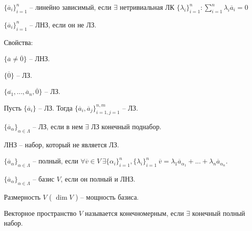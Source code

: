 	\begin{Def}
		$\{\overline{a}_i\}_{i = 1}^n$ -- линейно зависимый, если $\exists$ нетривиальная ЛК $\{\lambda_i\}_{i = 1}^n : \sum_{i = 1}^n \lambda_i \overline{a}_i = 0$   
	\end{Def}

	\begin{Def}
		$\{\overline{a}_i\}_{i = 1}^n$ -- ЛНЗ, если он не ЛЗ. 
	\end{Def}

	Свойства:
	\begin{MyList}
		\item $\{\overline{a} \neq \overline{0}\}$ -- ЛНЗ.
		\item $\{\overline{0}\}$ -- ЛЗ.
		\item $\{\overline{a_1}, ..., \overline{a}_n, \overline{0}\}$ -- ЛЗ.
		\item Пусть $\{\overline{a}_i\}$ -- ЛЗ. Тогда $\{\overline{a}_i, \overline{a}_j\}_{i = 1, j = 1}^{n, m}$ -- ЛЗ.
	\end{MyList}

	\begin{Def}
		$\{\overline{a}_\alpha\}_{\alpha \in \Lambda}$ -- ЛЗ, если в нем $\exists$ ЛЗ конечный поднабор.
	\end{Def}

	\begin{Def}
		ЛНЗ -- набор, который не является ЛЗ.
	\end{Def}

	\begin{Def}
		$\{\overline{a}_\alpha\}_{\alpha \in \Lambda}$ -- полный, если $\forall \overline{v} \in V \ \exists \{\alpha_i\}_{i = 1}^n, \{\lambda_i\}_{i = 1}^n \ \overline{v} = \lambda_1 \overline{a}_{\alpha_1} + ... + \lambda_n \overline{a}_{\alpha_n}$.
	\end{Def}

	\begin{Def}
		$\{\overline{a}_\alpha\}_{\alpha \in \Lambda}$ -- базис $V$, если он полный и ЛНЗ.
	\end{Def}

	\begin{Def}
		Размерность $V$ ( $\dim V$ ) -- мощность базиса.
	\end{Def}

	\begin{Def}
		Векторное пространство $V$ называется конечномерным, если $\exists$ конечный полный набор.
	\end{Def}

    \gdef\AuthorName{Дарья Гольденберг}

